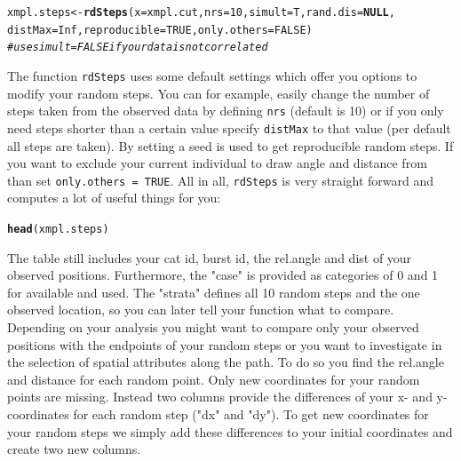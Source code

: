 \documentclass[11pt, a4paper]{article}\usepackage[]{graphicx}\usepackage[]{color}
\makeatletter
\newcommand{\hlnum}[1]{\textcolor[rgb]{0.686,0.059,0.569}{#1}}%
\newcommand{\hlcom}[1]{\textcolor[rgb]{0.678,0.584,0.686}{\textit{#1}}}%
\newcommand{\hlstd}[1]{\textcolor[rgb]{0.345,0.345,0.345}{#1}}%
\newcommand{\hlkwa}[1]{\textcolor[rgb]{0.161,0.373,0.58}{\textbf{#1}}}%
\newcommand{\hlkwb}[1]{\textcolor[rgb]{0.69,0.353,0.396}{#1}}%
\newcommand{\hlkwc}[1]{\textcolor[rgb]{0.333,0.667,0.333}{#1}}%
\newcommand{\hlkwd}[1]{\textcolor[rgb]{0.737,0.353,0.396}{\textbf{#1}}}%
\newenvironment{kframe}{%
 \def\at@end@of@kframe{}%
 \ifinner\ifhmode%
  \def\at@end@of@kframe{\end{minipage}}%
  \begin{minipage}{\columnwidth}%
 \fi\fi%
 \def\FrameCommand##1{\hskip\@totalleftmargin \hskip-\fboxsep
 \colorbox{shadecolor}{##1}\hskip-\fboxsep
     \hskip-\linewidth \hskip-\@totalleftmargin \hskip\columnwidth}%
 \MakeFramed {\advance\hsize-\width
   \@totalleftmargin\z@ \linewidth\hsize
   \@setminipage}}%
 {\par\unskip\endMakeFramed%
 \at@end@of@kframe}
\newenvironment{knitrout}{}{} %
\makeatother
\begin{document}
\begin{knitrout}
\color{fgcolor}\begin{kframe}
\begin{alltt}
\hlstd{xmpl.steps} \hlkwb{<-} \hlkwd{rdSteps}\hlstd{(}\hlkwc{x} \hlstd{= xmpl.cut,} \hlkwc{nrs} \hlstd{=} \hlnum{10}\hlstd{,} \hlkwc{simult} \hlstd{= T,} \hlkwc{rand.dis} \hlstd{=} \hlkwa{NULL}\hlstd{,}
                      \hlkwc{distMax} \hlstd{=} \hlnum{Inf}\hlstd{,} \hlkwc{reproducible} \hlstd{=} \hlnum{TRUE}\hlstd{,} \hlkwc{only.others} \hlstd{=} \hlnum{FALSE}\hlstd{)}
          \hlcom{# use simult = FALSE if your data is not correlated}
\end{alltt}
\end{kframe}
\end{knitrout}

\noindent The function \texttt{rdSteps} uses some default settings which offer you options to modify your random steps. You can for example, easily change the number of steps taken from the observed data by defining \texttt{nrs} (default is 10) or if you only need steps shorter than a certain value specify \texttt{distMax} to that value (per default all steps are taken). By setting  a seed is used to get reproducible random steps. If you want to exclude your current individual to draw angle and distance from than set \texttt{only.others = TRUE}.
All in all, \texttt{rdSteps} is very straight forward and computes a lot of useful things for you: 

\begin{knitrout}
\color{fgcolor}\begin{kframe}
\begin{alltt}
\hlkwd{head}\hlstd{(xmpl.steps)}
\end{alltt}


{\ttfamily\noindent\bfseries\color{errorcolor}{\#\# Error in head(xmpl.steps): object 'xmpl.steps' not found}}\end{kframe}
\end{knitrout}

\noindent The table still includes your cat id, burst id, the rel.angle and dist of your observed positions. Furthermore, the "case" is provided as categories of 0 and 1 for available and used. The "strata" defines all 10 random steps and the one observed location, so you can later tell your function what to compare.  
Depending on your analysis you might want to compare only your observed positions with the endpoints of your random steps or you want to investigate in the selection of spatial attributes along the path. To do so you find the rel.angle and distance for each random point. Only new coordinates for your random points are missing. Instead two columns provide the differences of your x- and y- coordinates for each random step ("dx" and "dy"). To get new coordinates for your random steps we simply add these differences to your initial coordinates and create two new columns. 
\end{document}
